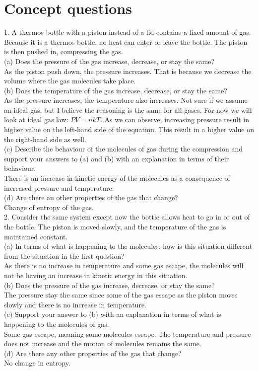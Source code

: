 \documentclass[reprint,english,notitlepage]{revtex4-2}
\begin{document}
\newpage
\appendix
\section{Concept questions}
1. A thermos bottle with a piston instead of a lid contains a fixed amount of gas. Because it is a thermos
bottle, no heat can enter or leave the bottle. The
piston is then pushed in, compressing the gas. \\
(a) Does the pressure of the gas increase, decrease,
or stay the same?\\
As the piston push down, the pressure increases. That is because we decrease the volume where the gas molecules take place.\\
(b) Does the temperature of the gas increase, decrease, or stay the same?\\
As the pressure increases, the temperature also increases. Not sure if we assume an ideal gas, but I believe the reasoning is the same for all gases. For now we will look at ideal gas law: $PV = nkT$. As we can observe, increasing pressure result in higher value on the left-hand side of the equation. This result in a higher value on the right-hand side as well.\\
(c) Describe the behaviour of the molecules of gas
during the compression and support your answers to (a) and (b) with an explanation in
terms of their behaviour. \\
There is an increase in kinetic energy of the molecules as a consequence of increased pressure and temperature.\\
(d) Are there an other properties of the gas that
change?\\
Change of entropy of the gas.\\

2. Consider the same system except now the bottle
allows heat to go in or out of the bottle. The piston
is moved slowly, and the temperature of the gas is
maintained constant.\\
(a) In terms of what is happening to the
molecules, how is this situation different from
the situation in the first question?\\
As there is no increase in temperature and some gas escape, the molecules will not be having an increase in kinetic energy in this situation.\\
(b) Does the pressure of the gas increase, decrease,
or stay the same?\\
The pressure stay the same since some of the gas escape as the piston moves slowly and there is no increase in temperature.\\
(c) Support your answer to (b) with an explanation in terms of what is happening to the
molecules of gas.\\
Some gas escape, meaning some molecules escape. The temperature and pressure does not increase and the motion of molecules remains the same.\\
(d) Are there any other properties of the gas that
change?\\
No change in entropy.
\end{document}
